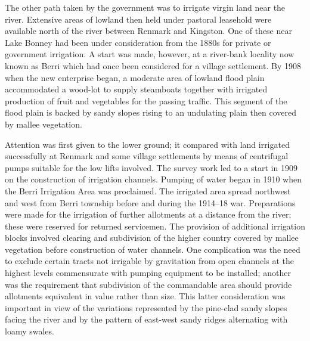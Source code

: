 
The other path taken by the government was to irrigate virgin land
near the river.  Extensive areas of lowland then held under pastoral
leasehold were available north of the river between Renmark and
King\-ston.  One of these near Lake Bonney  had
been under consideration from the 1880s for private or government
irrigation.  A start was made, however, at a river-bank locality now
known as Berri  which had once been considered for a
village settlement.  By 1908 when the new enterprise began, a moderate
area of lowland flood plain accommodated a wood-lot to supply
steamboats together with irrigated production of fruit and vegetables
for the passing traffic.  This segment of the flood plain is backed by
sandy slopes rising to an undulating plain then covered by mallee
vegetation.

Attention was first given to the lower ground; it compared with land
irrigated successfully at Renmark and some village settlements by
means of centrifugal pumps suitable for the low lifts involved.  The
survey work led to a start in 1909 on the construction of irrigation
channels.  Pumping of water began in 1910 when the Berri Irrigation
Area was proclaimed.  The irrigated area
spread northwest and west from Berri township before and during the
1914--18 war. Preparations were made for the irrigation of further
allotments at a distance from the river; these were reserved for
returned servicemen.  The provision of additional irrigation blocks
involved clearing and subdivision of the higher country covered by
mallee vegetation before construction of water channels.  One
complication was the need to exclude certain tracts not irrigable by
gravitation from open channels at the highest levels commensurate with
pumping equipment to be installed; another was the requirement that
subdivision of the commandable area should provide allotments
equivalent in value rather than size.  This latter consideration was
important in view of the variations represented by the pine-clad sandy
slopes facing the river and by the pattern of east-west sandy ridges
alternating with loamy swales.

